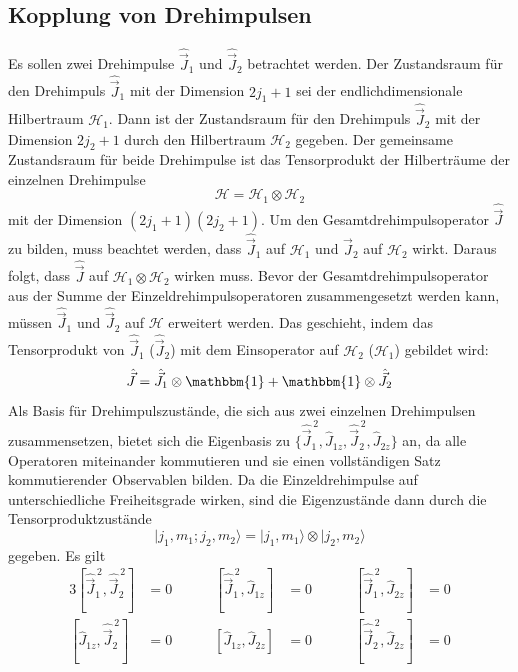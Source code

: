\documentclass[9pt]{report}
\begin{document}
\subsection{Kopplung von Drehimpulsen}
Es sollen zwei Drehimpulse $\hat{\vec{J}}_1$ und $\hat{\vec{J}}_2$ betrachtet werden. Der Zustandsraum für den Drehimpuls $\hat{\vec{J}}_1$ mit der Dimension $2j_1+1$ sei der endlichdimensionale Hilbertraum $\mathcal{H}_1$. Dann ist der Zustandsraum für den Drehimpuls $\hat{\vec{J}}_2$ mit der Dimension $2j_2+1$ durch den Hilbertraum $\mathcal{H}_2$ gegeben. Der gemeinsame Zustandsraum für beide Drehimpulse ist das Tensorprodukt der Hilberträume der einzelnen Drehimpulse
\begin{equation}
\mathcal{H}=\mathcal{H}_1\otimes\mathcal{H}_2
\end{equation}
mit der Dimension $(2j_1+1)(2j_2+1)$. Um den Gesamtdrehimpulsoperator $\hat{\vec{J}}$ zu bilden, muss beachtet werden, dass $\hat{\vec{J}}_1$ auf $\mathcal{H}_1$ und $\hat{\vec{J}}_2$ auf $\mathcal{H}_2$ wirkt. Daraus folgt, dass $\hat{\vec{J}}$ auf $\mathcal{H}_1\otimes\mathcal{H}_2$ wirken muss. Bevor der Gesamtdrehimpulsoperator aus der Summe der Einzeldrehimpulsoperatoren zusammengesetzt werden kann, müssen $\hat{\vec{J}}_1$ und $\hat{\vec{J}}_2$ auf $\mathcal{H}$ erweitert werden. Das geschieht, indem das Tensorprodukt von $\hat{\vec{J}}_1$ ($\hat{\vec{J}}_2$) mit dem Einsoperator auf $\mathcal{H}_2$ ($\mathcal{H}_1$) gebildet wird:
\begin{equation}
\hat{\vec{J}}=\hat{\vec{J}}_{1}\otimes\mathbbm{1}+\mathbbm{1}\otimes\hat{\vec{J}}_{2}\label{Hilbertraum-Erweiterung}
\end{equation}
Als Basis für Drehimpulszustände, die sich aus zwei einzelnen Drehimpulsen zusammensetzen, bietet sich die Eigenbasis zu $\{\hat{\vec{J}}_{1}^{\,2},\hat{J}_{1z},\hat{\vec{J}}_{2}^{\,2},\hat{J}_{2z}\}$ an, da alle Operatoren miteinander kommutieren und sie einen vollständigen Satz kommutierender Observablen bilden. Da die Einzeldrehimpulse auf unterschiedliche Freiheitsgrade wirken, sind die Eigenzustände dann durch die Tensorproduktzustände
\begin{equation}
\big|j_{1},m_{1};j_{2},m_{2}\big\rangle = \big|j_{1},m_{1}\big\rangle\otimes \big|j_{2},m_{2}\big\rangle\label{uncoupled_states}
\end{equation}
gegeben. Es gilt
\begin{alignat*}{3}
[\hat{\vec{J}}_{1}^{\,2},\hat{\vec{J}}_{2}^{\,2}] &= 0\qquad\quad
[\hat{\vec{J}}_{1}^{\,2},\hat{J}_{1z}] &= 0\qquad\quad
[\hat{\vec{J}}_{1}^{\,2},\hat{J}_{2z}] &= 0\\
[\hat{J}_{1z},\hat{\vec{J}}_{2}^{\,2}] &= 0\qquad\quad
[\hat{J}_{1z},\hat{J}_{2z}] &= 0\qquad\quad
[\hat{\vec{J}}_{2}^{\,2},\hat{J}_{2z}] &= 0
\end{alignat*}
\end{document}
